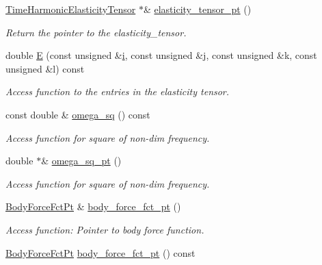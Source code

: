 \begin{DoxyCompactItemize}
\hyperlink{classoomph_1_1TimeHarmonicElasticityTensor}{Time\+Harmonic\+Elasticity\+Tensor} $\ast$\& \hyperlink{classoomph_1_1TimeHarmonicLinearElasticityEquationsBase_a0a8de8463ef9e91f0cb1053e60fb02c3}{elasticity\+\_\+tensor\+\_\+pt} ()
\begin{DoxyCompactList}\small\item\em Return the pointer to the elasticity\+\_\+tensor. \end{DoxyCompactList}\item 
double \hyperlink{classoomph_1_1TimeHarmonicLinearElasticityEquationsBase_abb02bc2bde900a4f4b447dc4f3878caa}{E} (const unsigned \&\hyperlink{cfortran_8h_adb50e893b86b3e55e751a42eab3cba82}{i}, const unsigned \&j, const unsigned \&k, const unsigned \&l) const
\begin{DoxyCompactList}\small\item\em Access function to the entries in the elasticity tensor. \end{DoxyCompactList}\item 
const double \& \hyperlink{classoomph_1_1TimeHarmonicLinearElasticityEquationsBase_ab28add7b27b84c2d1726af7335cf2c84}{omega\+\_\+sq} () const
\begin{DoxyCompactList}\small\item\em Access function for square of non-\/dim frequency. \end{DoxyCompactList}\item 
double $\ast$\& \hyperlink{classoomph_1_1TimeHarmonicLinearElasticityEquationsBase_a16e82dada5446d62cd97b802f456b423}{omega\+\_\+sq\+\_\+pt} ()
\begin{DoxyCompactList}\small\item\em Access function for square of non-\/dim frequency. \end{DoxyCompactList}\item 
\hyperlink{classoomph_1_1TimeHarmonicLinearElasticityEquationsBase_a8cff2941bd4dc9fd3714c151cf5b6e33}{Body\+Force\+Fct\+Pt} \& \hyperlink{classoomph_1_1TimeHarmonicLinearElasticityEquationsBase_a73c637e0010ca0dfb8562a931bb5faf1}{body\+\_\+force\+\_\+fct\+\_\+pt} ()
\begin{DoxyCompactList}\small\item\em Access function\+: Pointer to body force function. \end{DoxyCompactList}\item 
\hyperlink{classoomph_1_1TimeHarmonicLinearElasticityEquationsBase_a8cff2941bd4dc9fd3714c151cf5b6e33}{Body\+Force\+Fct\+Pt} \hyperlink{classoomph_1_1TimeHarmonicLinearElasticityEquationsBase_ac9fbd29f0373e6762212b75212b43998}{body\+\_\+force\+\_\+fct\+\_\+pt} () const

\end{DoxyCompactItemize}
